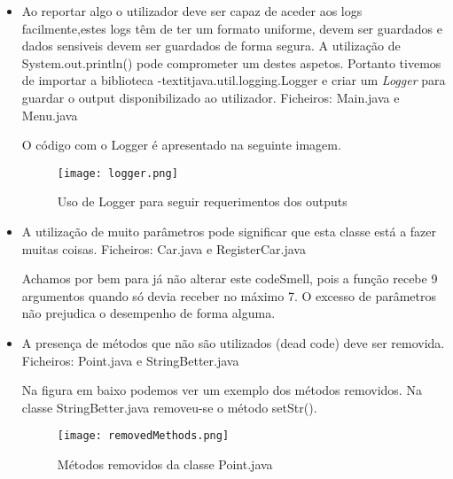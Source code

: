 \begin{itemize}
\item Ao reportar algo o utilizador deve ser capaz de aceder aos logs facilmente,estes logs têm de ter um formato uniforme, devem ser guardados e dados sensiveis devem ser guardados de forma segura. A utilização de System.out.println() pode comprometer um destes aspetos. Portanto tivemos de importar a biblioteca -textit{java.util.logging.Logger} e criar um \textit{Logger} para guardar o output disponibilizado ao utilizador.\newline
 Ficheiros: Main.java e  Menu.java\newline

\par O código com o Logger é apresentado na seguinte imagem.

 \begin{figure}[H]

  \centering

  \texttt{[image: logger.png]}

  \caption {Uso de Logger para seguir requerimentos dos outputs}

  \label {fig14}

\end{figure}
\end{itemize}

\begin{itemize}
\item A utilização de muito parâmetros pode significar que esta classe está a fazer muitas coisas. \newline
Ficheiros: Car.java e RegisterCar.java\newline


\par Achamos por bem para já não alterar este codeSmell, pois a função recebe 9 argumentos quando só devia receber no máximo 7. O excesso de parâmetros não prejudica o desempenho de forma alguma.

\end{itemize}

\begin{itemize}
\item A presença de métodos que não são utilizados (dead code) deve ser removida. \newline
Ficheiros: Point.java e StringBetter.java \newline

\par Na figura em baixo podemos ver um exemplo dos métodos removidos. Na classe StringBetter.java removeu-se o método setStr().
 \begin{figure}[H]

  \centering

  \texttt{[image: removedMethods.png]}

  \caption {Métodos removidos da classe Point.java}

  \label {fig15}

\end{figure}
\end{itemize}

